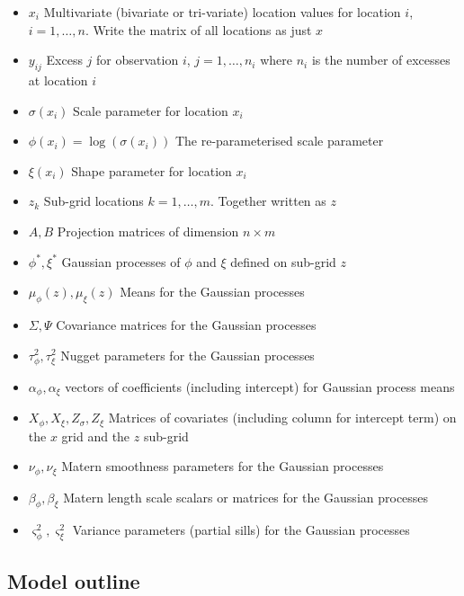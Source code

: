 \documentclass{article}
\begin{document}
\begin{itemize}
\item $x_i$ Multivariate (bivariate or tri-variate) location values for location $i$, $i = 1,\ldots, n$. Write the matrix of all locations as just $x$
\item $y_{ij}$ Excess $j$ for observation $i$, $j = 1,\ldots,n_i$ where $n_i$ is the number of excesses at location $i$
\item $\sigma(x_i)$ Scale parameter for location $x_i$
\item $\phi(x_i) = \log(\sigma(x_i))$ The re-parameterised scale parameter
\item $\xi(x_i)$ Shape parameter for location $x_i$
\item $z_k$ Sub-grid locations $k = 1, \ldots, m$. Together written as $z$
\item $A, B$ Projection matrices of dimension $n \times m$
\item $\phi^*, \xi^*$ Gaussian processes of $\phi$ and $\xi$ defined on sub-grid $z$
\item $\mu_\phi(z), \mu_\xi(z)$ Means for the Gaussian processes
\item $\Sigma, \Psi$ Covariance matrices for the Gaussian processes
\item $\tau^2_\phi, \tau^2_\xi$ Nugget parameters for the Gaussian processes
\item $\alpha_\phi, \alpha_\xi$ vectors of coefficients (including intercept) for Gaussian process means
\item $X_\phi, X_\xi, Z_\sigma, Z_\xi$ Matrices of covariates (including column for intercept term) on the $x$ grid and the $z$ sub-grid
\item $\nu_\phi, \nu_\xi$ Matern smoothness parameters for the Gaussian processes
\item $\beta_\phi, \beta_\xi$ Matern length scale scalars or matrices for the Gaussian processes
\item $\varsigma^2_\phi, \varsigma^2_\xi$ Variance parameters (partial sills) for the Gaussian processes
\end{itemize}

\subsection*{Model outline} \label{outline}
\end{document}
